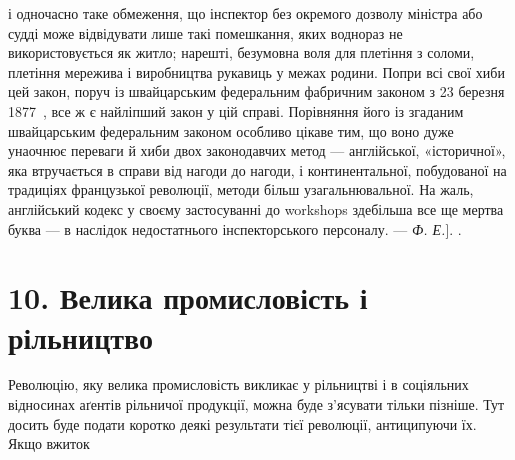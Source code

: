{і одночасно таке обмеження, що інспектор без окремого дозволу міністра
або судді може відвідувати лише такі помешкання, яких воднораз не
використовується як житло; нарешті, безумовна воля для плетіння з
соломи, плетіння мережива і виробництва рукавиць у межах родини.
Попри всі свої хиби цей закон, поруч із швайцарським федеральним
фабричним законом з 23 березня 1877~, все ж є найліпший закон у цій
справі. Порівняння його із згаданим швайцарським федеральним законом
особливо цікаве тим, що воно дуже унаочнює переваги й хиби двох законодавчих
метод — англійської, «історичної», яка втручається в справи
від нагоди до нагоди, і континентальної, побудованої на традиціях французької
революції, методи більш узагальнювальної. На жаль, англійський
кодекс у своєму застосуванні до workshops здебільша все ще мертва
буква — в наслідок недостатнього інспекторського персоналу. — \emph{Ф. Е.}].
}.

\section*{10. Велика промисловість і рільництво}

Революцію, яку велика промисловість викликає у рільництві
і в соціяльних відносинах аґентів рільничої продукції, можна
буде з’ясувати тільки пізніше. Тут досить буде подати коротко
деякі результати тієї революції, антиципуючи їх. Якщо вжиток
\parbreak{}  %
